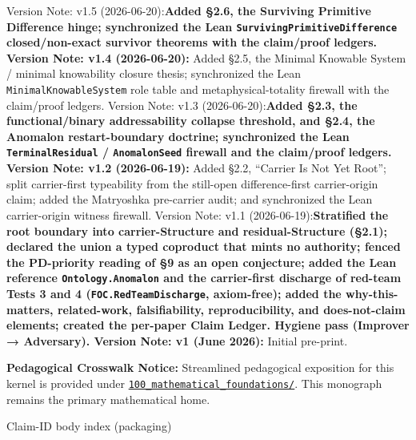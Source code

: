 \documentclass[
  10pt,
]{article}
\renewenvironment{quote}
  {\begin{leftbar}\small}
  {\end{leftbar}}
\DeclareRobustCommand{\texttt}[1]{{\paperSymbolFont\nolinkurl{#1}}}
\begin{document}
Version Note: v1.5 (2026-06-20):\textbf{Added §2.6, the Surviving Primitive Difference hinge; synchronized the Lean \texttt{SurvivingPrimitiveDifference} closed/non-exact survivor theorems with the claim/proof ledgers. Version Note: v1.4 (2026-06-20):} Added §2.5, the Minimal Knowable System / minimal knowability closure thesis; synchronized the Lean \texttt{MinimalKnowableSystem} role table and metaphysical-totality firewall with the claim/proof ledgers. Version Note: v1.3 (2026-06-20):\textbf{Added §2.3, the functional/binary addressability collapse threshold, and §2.4, the Anomalon restart-boundary doctrine; synchronized the Lean \texttt{TerminalResidual} / \texttt{AnomalonSeed} firewall and the claim/proof ledgers. Version Note: v1.2 (2026-06-19):} Added §2.2, ``Carrier Is Not Yet Root''; split carrier-first typeability from the still-open difference-first carrier-origin claim; added the Matryoshka pre-carrier audit; and synchronized the Lean carrier-origin witness firewall. Version Note: v1.1 (2026-06-19):\textbf{Stratified the root boundary into carrier-Structure and residual-Structure (§2.1); declared the union a typed coproduct that mints no authority; fenced the PD-priority reading of §9 as an open conjecture; added the Lean reference \texttt{Ontology.Anomalon} and the carrier-first discharge of red-team Tests 3 and 4 (\texttt{FOC.RedTeamDischarge}, axiom-free); added the why-this-matters, related-work, falsifiability, reproducibility, and does-not-claim elements; created the per-paper Claim Ledger. Hygiene pass (Improver → Adversary). Version Note: v1 (June 2026):} Initial pre-print.

\begin{quote}
\textbf{Pedagogical Crosswalk Notice:} Streamlined pedagogical exposition for this kernel is provided under \href{../100_mathematical_foundations/}{\texttt{100\_mathematical\_foundations/}}. This monograph remains the primary mathematical home.
\end{quote}

Claim-ID body index (packaging)
\end{document}
